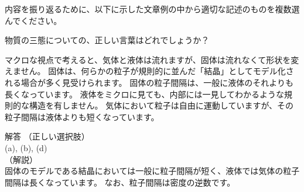 \documentclass[uplatex,dvipdfmx,a4paper,11pt]{jsarticle}
\begin{document}
内容を振り返るために、以下に示した文章例の中から適切な記述のものを複数選んでください。
\begin{qlist}
	\qitem 物質の三態についての、正しい言葉はどれでしょうか？
		\begin{qlist2}
			\qitem マクロな視点で考えると、気体と液体は流れますが、固体は流れなくて形状を変えません。
			\qitem 固体は、何らかの粒子が規則的に並んだ「結晶」としてモデル化される場合が多く見受けられます。
			\qitem 固体の粒子間隔は、一般に液体のそれよりも長くなっています。
			\qitem 液体をミクロに見ても、内部には一見してわかるような規則的な構造を有しません。
			\qitem 気体において粒子は自由に運動していますが、その粒子間隔は液体よりも短くなっています。
		\end{qlist2}
        \vspace{3mm}
        \begin{itembox}[l]{解答}
            （正しい選択肢）\\
            (a), (b), (d)\\
            （解説）\\
            固体のモデルである結晶においては一般に粒子間隔が短く、液体では気体の粒子間隔は長くなっています。
            なお、粒子間隔は密度の逆数です。


\end{itembox}
\end{qlist}
\end{document}
